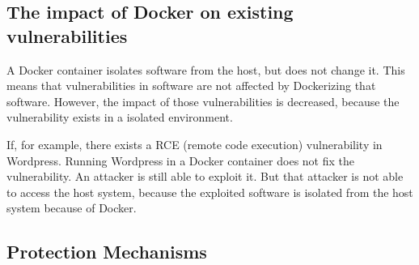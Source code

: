 \subsection{The impact of Docker on existing vulnerabilities}
A Docker container isolates software from the host, but does not change it. This means that vulnerabilities in software are not affected by Dockerizing that software. However, the impact of those vulnerabilities is decreased, because the vulnerability exists in a isolated environment.

If, for example, there exists a RCE (remote code execution) vulnerability in Wordpress. Running Wordpress in a Docker container does not fix the vulnerability. An attacker is still able to exploit it. But that attacker is not able to access the host system, because the exploited software is isolated from the host system because of Docker. 

\subsection{Protection Mechanisms}
